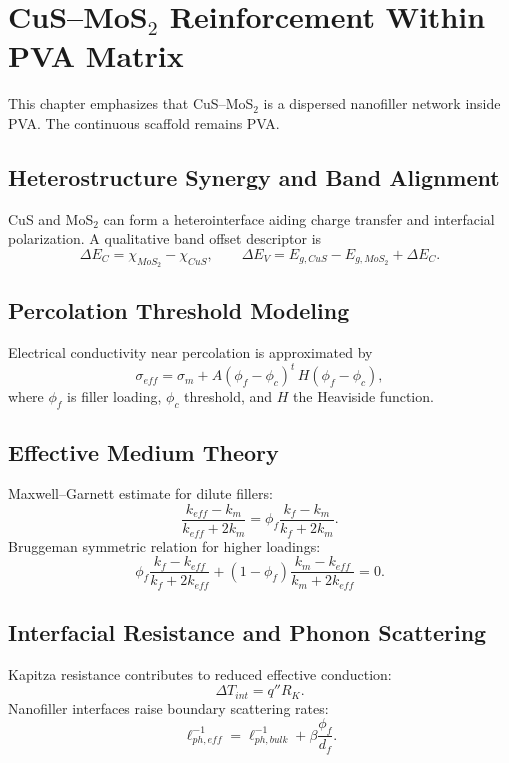\chapter{CuS--MoS$_2$ Reinforcement Within PVA Matrix}\label{ch:cusmos2}

This chapter emphasizes that CuS--MoS$_2$ is a dispersed nanofiller network inside PVA. The continuous scaffold remains PVA.

\section{Heterostructure Synergy and Band Alignment}
CuS and MoS$_2$ can form a heterointerface aiding charge transfer and interfacial polarization. A qualitative band offset descriptor is
\begin{equation}\label{eq:band_offset}
\Delta E_C=\chi_{MoS_2}-\chi_{CuS},\qquad \Delta E_V=E_{g,CuS}-E_{g,MoS_2}+\Delta E_C.
\end{equation}

\section{Percolation Threshold Modeling}
Electrical conductivity near percolation is approximated by
\begin{equation}\label{eq:percolation}
\sigma_{eff}=\sigma_m + A(\phi_f-\phi_c)^t\,H(\phi_f-\phi_c),
\end{equation}
where $\phi_f$ is filler loading, $\phi_c$ threshold, and $H$ the Heaviside function.

\section{Effective Medium Theory}
Maxwell--Garnett estimate for dilute fillers:
\begin{equation}\label{eq:mg}
\frac{k_{eff}-k_m}{k_{eff}+2k_m}=\phi_f\frac{k_f-k_m}{k_f+2k_m}.
\end{equation}
Bruggeman symmetric relation for higher loadings:
\begin{equation}\label{eq:bruggeman}
\phi_f\frac{k_f-k_{eff}}{k_f+2k_{eff}}+(1-\phi_f)\frac{k_m-k_{eff}}{k_m+2k_{eff}}=0.
\end{equation}

\section{Interfacial Resistance and Phonon Scattering}
Kapitza resistance contributes to reduced effective conduction:
\begin{equation}\label{eq:kapitza}
\Delta T_{int}=q''R_K.
\end{equation}
Nanofiller interfaces raise boundary scattering rates:
\begin{equation}\label{eq:phonon_boundary}
\ell_{ph,eff}^{-1}=\ell_{ph,bulk}^{-1}+\beta\frac{\phi_f}{d_f}.
\end{equation}

